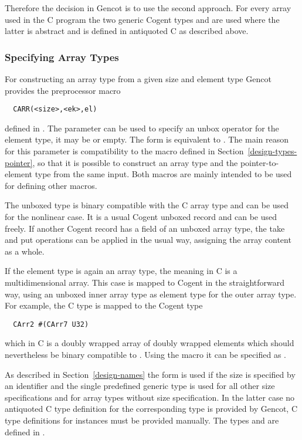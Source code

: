 Therefore the decision in Gencot is to use the second approach. For every array  used in the C 
program the two generic Cogent types  and  are used where the latter is
abstract and is defined in antiquoted C as described above.

\subsubsection{Specifying Array Types}

For constructing an array type from a given size and element type Gencot provides the preprocessor macro
\begin{verbatim}
  CARR(<size>,<ek>,el)
\end{verbatim}
defined in . The parameter  can be used to specify an unbox
operator for the element type, it may be  or empty. The form  is equivalent
to . The main reason for this parameter is compatibility to the macro 
defined in Section~\ref{design-types-pointer}, so that it is possible to construct an array type and the 
pointer-to-element type from the same input. Both macros are mainly intended to be used for defining other
macros.

The unboxed type  is binary compatible with the C array type and can be used for
the nonlinear case. It is a usual Cogent unboxed record and can be used freely. 
If another Cogent record has a field of an unboxed array type, the take and put operations can be applied
in the usual way, assigning the array content as a whole.

If the element type  is again an array type, the meaning in C is a multidimensional array.
This case is mapped to Cogent in the straightforward way, using an unboxed inner array type as element type
for the outer array type. For example, the C type  is mapped to the Cogent type
\begin{verbatim}
  CArr2 #(CArr7 U32)
\end{verbatim}
which in C is a doubly wrapped array of doubly wrapped elements which should nevertheless be binary compatible 
to . Using the macro  it can be specified as .

As described in Section~\ref{design-names} the form 
is used if the size is specified by an identifier and the single predefined generic type  is used for all other
size specifications and for array types without size specification. In the latter case no antiquoted C type definition
for the corresponding type  is provided by Gencot, C type definitions for instances must be provided 
manually. The types  and  are defined in .

